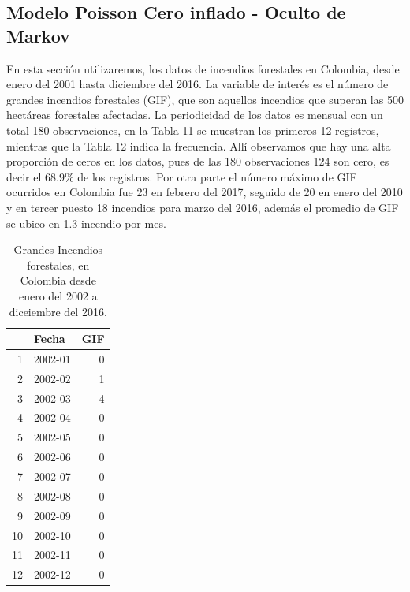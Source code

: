 \documentclass[a4paper]{article}\usepackage[]{graphicx}\usepackage[]{color}
\begin{document}
\subsection{Modelo Poisson Cero inflado - Oculto de Markov}



En esta sección utilizaremos, los datos de incendios forestales en Colombia, desde enero del 2001 hasta diciembre del 2016.  La variable de interés es el número de grandes incendios forestales (GIF), que son aquellos incendios que superan las 500 hectáreas forestales afectadas. La periodicidad de los datos es mensual con un total 180 observaciones, en la Tabla 11 se muestran los primeros 12 registros, mientras que la Tabla 12 indica la frecuencia. Allí observamos que hay una alta proporción de ceros en los datos, pues de las 180 observaciones 124 son cero, es decir el $68.9 \%$ de los registros. Por otra parte el número máximo de GIF ocurridos en Colombia fue 23 en febrero del 2017, seguido de 20 en enero del 2010 y en tercer puesto 18 incendios para marzo del 2016, además el promedio de GIF se ubico en 1.3  incendio por mes.

\begin{table}[ht]
\centering
\begin{tabular}{rlr}
  \hline
 & Fecha & GIF \\ 
  \hline
1 & 2002-01 &   0 \\ 
  2 & 2002-02 &   1 \\ 
  3 & 2002-03 &   4 \\ 
  4 & 2002-04 &   0 \\ 
  5 & 2002-05 &   0 \\ 
  6 & 2002-06 &   0 \\ 
  7 & 2002-07 &   0 \\ 
  8 & 2002-08 &   0 \\ 
  9 & 2002-09 &   0 \\ 
  10 & 2002-10 &   0 \\ 
  11 & 2002-11 &   0 \\ 
  12 & 2002-12 &   0 \\ 
   \hline
\end{tabular}
\caption{Grandes Incendios forestales, en Colombia desde enero del 2002 a diceiembre del 2016.} 
\end{table}
\end{document}
